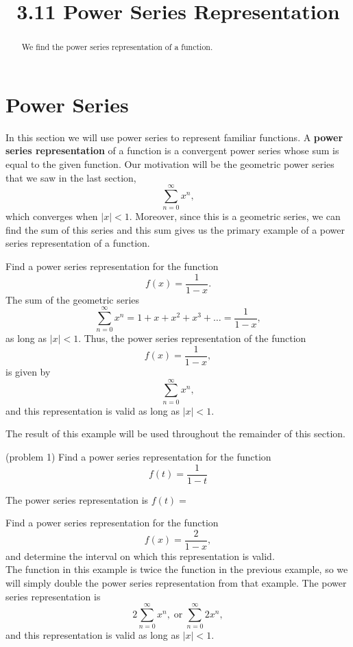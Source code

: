 \documentclass{ximera}
\title{3.11 Power Series Representation}
\begin{document}
\begin{abstract}
We find the power series representation of a function.
\end{abstract}

\maketitle

\section{Power Series}

In this section we will use power series to represent familiar functions.
A \textbf{power series representation} of a function is a convergent power series whose sum is equal to the given function.
Our motivation will be the geometric power series that we saw in the last section,
\[
\sum_{n=0}^\infty x^n,
\]
which converges when $|x| < 1$. Moreover, since this is a geometric series, we can find the sum of this series
and this sum gives us the primary example of a power series representation of a function.

\begin{example}[example 1]
Find a power series representation for the function 
\[
f(x) = \frac{1}{1-x}.
\]
The sum of the geometric series
\[
\sum_{n=0}^\infty x^n = 1 + x + x^2 + x^3 + \dots =  \frac{1}{1-x},
\]
as long as $|x| < 1$.  Thus, the power series representation of the function 
\[
f(x) = \frac{1}{1-x},
\]
is given by 
\[
\sum_{n=0}^\infty x^n,
\]
and this representation is valid as long as $|x| < 1$.
\end{example}

The result of this example will be used throughout the remainder of this section.


\begin{problem}(problem 1)
Find a power series representation for the function
\[
f(t) = \frac{1}{1-t}
\]

The power series representation is $f(t) = $
\begin{multipleChoice}
\end{multipleChoice}
\end{problem}




\begin{example}[example 2]
Find a power series representation for the function
\[
f(x) = \frac{2}{1-x},
\]
and determine the interval on which this representation is valid.\\
The function in this example is twice the function in the previous example, 
so we will simply double the power series representation from that example.
The power series representation is
\[
2\sum_{n=0}^\infty x^n,  \; \text{or} \; \sum_{n=0}^\infty 2x^n,
\]
and this representation is valid as long as $|x| < 1$.

\end{example}
\end{document}
